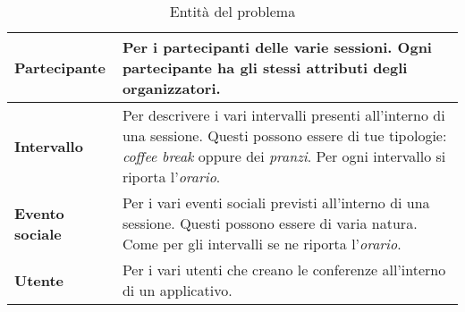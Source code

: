 \begin{table}[h!]
\begin{tabularx}{\textwidth}{|l|X|}
\textbf{Partecipante} & Per i partecipanti delle varie sessioni. Ogni partecipante ha gli stessi attributi degli organizzatori. \\ \hline
\textbf{Intervallo} & Per descrivere i vari intervalli presenti all'interno di una sessione. Questi possono essere di tue tipologie: \textit{coffee break} oppure dei \textit{pranzi}. Per ogni intervallo si riporta l'\textit{orario}. \\ \hline
\textbf{Evento sociale} & Per i vari eventi sociali previsti all'interno di una sessione. Questi possono essere di varia natura. Come per gli intervalli se ne riporta l'\textit{orario}. \\ \hline
\textbf{Utente} & Per i vari utenti che creano le conferenze all'interno di un applicativo. \\ \hline
\end{tabularx}
\caption{Entità del problema}\label{tab:entities}
\end{table}

